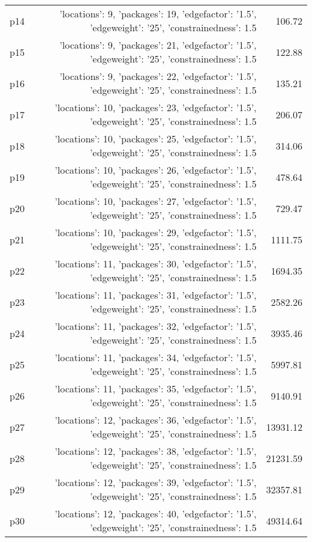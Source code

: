 \documentclass{article}
\begin{document}
\begin{center}
\begin{tabular}{@{}l|r|r@{}}
  p14&{'locations': 9, 'packages': 19, 'edgefactor': '1.5', 'edgeweight': '25', 'constrainedness': 1.5}&106.72\\
  p15&{'locations': 9, 'packages': 21, 'edgefactor': '1.5', 'edgeweight': '25', 'constrainedness': 1.5}&122.88\\
  p16&{'locations': 9, 'packages': 22, 'edgefactor': '1.5', 'edgeweight': '25', 'constrainedness': 1.5}&135.21\\
  p17&{'locations': 10, 'packages': 23, 'edgefactor': '1.5', 'edgeweight': '25', 'constrainedness': 1.5}&206.07\\
  p18&{'locations': 10, 'packages': 25, 'edgefactor': '1.5', 'edgeweight': '25', 'constrainedness': 1.5}&314.06\\
  p19&{'locations': 10, 'packages': 26, 'edgefactor': '1.5', 'edgeweight': '25', 'constrainedness': 1.5}&478.64\\
  p20&{'locations': 10, 'packages': 27, 'edgefactor': '1.5', 'edgeweight': '25', 'constrainedness': 1.5}&729.47\\
  p21&{'locations': 10, 'packages': 29, 'edgefactor': '1.5', 'edgeweight': '25', 'constrainedness': 1.5}&1111.75\\
  p22&{'locations': 11, 'packages': 30, 'edgefactor': '1.5', 'edgeweight': '25', 'constrainedness': 1.5}&1694.35\\
  p23&{'locations': 11, 'packages': 31, 'edgefactor': '1.5', 'edgeweight': '25', 'constrainedness': 1.5}&2582.26\\
  p24&{'locations': 11, 'packages': 32, 'edgefactor': '1.5', 'edgeweight': '25', 'constrainedness': 1.5}&3935.46\\
  p25&{'locations': 11, 'packages': 34, 'edgefactor': '1.5', 'edgeweight': '25', 'constrainedness': 1.5}&5997.81\\
  p26&{'locations': 11, 'packages': 35, 'edgefactor': '1.5', 'edgeweight': '25', 'constrainedness': 1.5}&9140.91\\
  p27&{'locations': 12, 'packages': 36, 'edgefactor': '1.5', 'edgeweight': '25', 'constrainedness': 1.5}&13931.12\\
  p28&{'locations': 12, 'packages': 38, 'edgefactor': '1.5', 'edgeweight': '25', 'constrainedness': 1.5}&21231.59\\
  p29&{'locations': 12, 'packages': 39, 'edgefactor': '1.5', 'edgeweight': '25', 'constrainedness': 1.5}&32357.81\\
  p30&{'locations': 12, 'packages': 40, 'edgefactor': '1.5', 'edgeweight': '25', 'constrainedness': 1.5}&49314.64
                            \end{tabular}
                            \end{center}
                    
\end{document}
